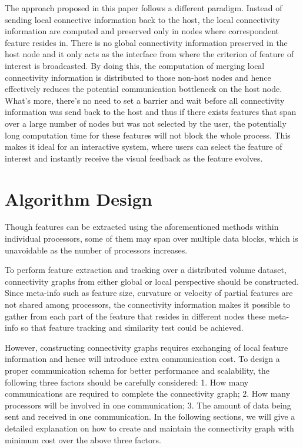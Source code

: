 \documentclass[10pt, conference, compsocconf]{IEEEtran}
\begin{document}
The approach proposed in this paper follows a different paradigm. Instead of sending local connective information back to the host, the local connectivity information are computed and preserved only in nodes where correspondent feature resides in. There is no global connectivity information preserved in the host node and it only acts as the interface from where the criterion of feature of interest is broadcasted. By doing this, the computation of merging local connectivity information is distributed to those non-host nodes and hence effectively reduces the potential communication bottleneck on the host node. What's more, there's no need to set a barrier and wait before all connectivity information was send back to the host and thus if there exists features that span over a large number of nodes but was not selected by the user, the potentially long computation time for these features will not block the whole process. This makes it ideal for an interactive system, where users can select the feature of interest and instantly receive the visual feedback as the feature evolves.

\section{Algorithm Design}
Though features can be extracted using the aforementioned methods within individual processors, some of them may span over multiple data blocks, which is unavoidable as the number of processors increases. 

To perform feature extraction and tracking over a distributed volume dataset, connectivity graphs from either global or local perspective should be constructed. Since meta-info such as feature size, curvature or velocity of partial features are not shared among processors, the connectivity information makes it possible to gather from each part of the feature that resides in different nodes these meta-info so that feature tracking and similarity test could be achieved. 

However, constructing connectivity graphs requires exchanging of local feature information and hence will introduce extra communication cost. To design a proper communication schema for better performance and scalability, the following three factors should be carefully considered:
1.	How many communications are required to complete the connectivity graph;
2.	How many processors will be involved in one communication;
3.	The amount of data being sent and received in one communication.
In the following sections, we will give a detailed explanation on how to create and maintain the connectivity graph with minimum cost over the above three factors.
\end{document}
